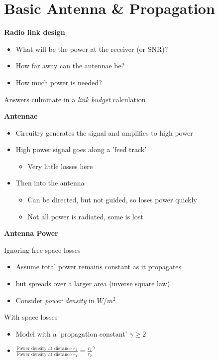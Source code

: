 \documentclass[12pt]{article}
\begin{document}
\section{Basic Antenna \& Propagation}
\textbf{Radio link design}
\begin{itemize}[noitemsep]
    \item What will be the power at the receiver (or SNR)?
    \item How far away can the antennae be?
    \item How much power is needed?
\end{itemize}
Answers culminate in a \textit{link budget} calculation

\textbf{Antennae}
\begin{itemize}[noitemsep]
    \item Circuitry generates the signal and amplifies to high power
    \item High power signal goes along a 'feed track'
    \begin{itemize}[noitemsep]
        \item Very little losses here
    \end{itemize}
    \item Then into the antenna
    \begin{itemize}[noitemsep]
        \item Can be directed, but not guided, so loses power quickly
        \item Not all power is radiated, some is lost
    \end{itemize}
\end{itemize}

\begin{flushright}[Lecture on 1.5]\end{flushright}

\textbf{Antenna Power}

Ignoring free space losses
\begin{itemize}[noitemsep]
    \item Assume total power remains constant as it propagates
    \item but spreads over a larger area (inverse square law)
    \item Consider \textit{power density} in $W/m^2$
\end{itemize}

With space losses
\begin{itemize}[noitemsep]
    \item Model with a 'propagation constant' $\gamma \ge 2$
    \item \begin{math}
    \frac{\text{Power density at distance }r_2}{\text{Power density at distance }r_1} = \frac{r_1}{r_2}^\gamma
    \end{math}
\end{itemize}
\end{document}
